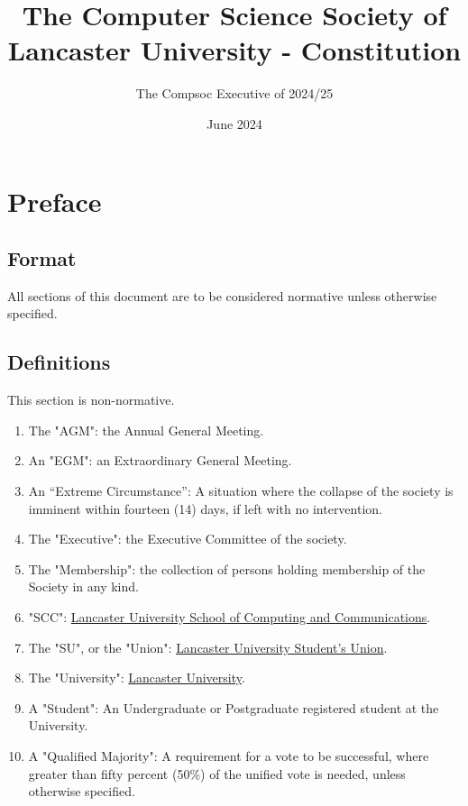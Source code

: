 \documentclass[parskip=half]{scrartcl}
\title{The Computer Science Society of\\ Lancaster University - Constitution}
\author{The Compsoc Executive of 2024/25}
\date{June 2024}
\begin{document}
    \maketitle

    \clearpage
    \tableofcontents

    \clearpage
    \section{Preface}
        \label{preface}
        \subsection{Format}
            \label{preface--format}
            All sections of this document are to be considered normative unless otherwise specified.

        \subsection{Definitions}
            \label{preface--definition}
            This section is non-normative.

            \begin{enumerate}
                \item The "AGM": the Annual General Meeting.
                \item An "EGM": an Extraordinary General Meeting.
                \item An “Extreme Circumstance”: A situation where the collapse of the society is imminent within fourteen (14) days, if left with no intervention.
                \item The "Executive": the Executive Committee of the society.
                \item The "Membership": the collection of persons holding membership of the Society in any kind.
                \item "SCC": \href{https://www.lancaster.ac.uk/scc}{Lancaster University School of Computing and Communications}.
                \item The "SU", or the "Union": \href{https://www.lancastersu.co.uk}{Lancaster University Student's Union}.
                \item The "University": \href{https://www.lancaster.ac.uk}{Lancaster University}.
                \item A "Student": An Undergraduate or Postgraduate registered student at the University.
                \item A "Qualified Majority": A requirement for a vote to be successful, where greater than fifty percent (50\%) of the unified vote is needed, unless otherwise specified.
            \end{enumerate}
\end{document}
